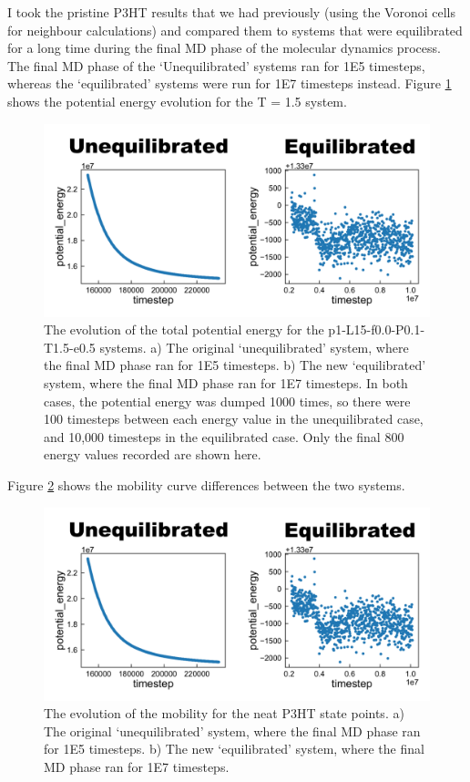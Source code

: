\documentclass[12pt]{article}
\begin{document}
I took the pristine P3HT results that we had previously (using the Voronoi cells for neighbour calculations) and compared them to systems that were equilibrated for a long time during the final MD phase of the molecular dynamics process.
The final MD phase of the `Unequilibrated' systems ran for 1E5 timesteps, whereas the `equilibrated' systems were run for 1E7 timesteps instead.
Figure \ref{fig:Energy} shows the potential energy evolution for the T = 1.5 system.


\begin{figure}[h!]\centering
	\includegraphics[width=\textwidth]{Figures/PE.pdf}
    \caption{The evolution of the total potential energy for the p1-L15-f0.0-P0.1-T1.5-e0.5 systems.
    a) The original `unequilibrated' system, where the final MD phase ran for 1E5 timesteps.
    b) The new `equilibrated' system, where the final MD phase ran for 1E7 timesteps.
    In both cases, the potential energy was dumped 1000 times, so there were 100 timesteps between each energy value in the unequilibrated case, and 10,000 timesteps in the equilibrated case.
    Only the final 800 energy values recorded are shown here.}
	\label{fig:Energy}
\end{figure}


Figure \ref{fig:Mobility} shows the mobility curve differences between the two systems.


\begin{figure}[h!]\centering
	\includegraphics[width=\textwidth]{Figures/PE.pdf}
    \caption{The evolution of the mobility for the neat P3HT state points.
    a) The original `unequilibrated' system, where the final MD phase ran for 1E5 timesteps.
    b) The new `equilibrated' system, where the final MD phase ran for 1E7 timesteps.
}
	\label{fig:Mobility}
\end{figure}
\end{document}
